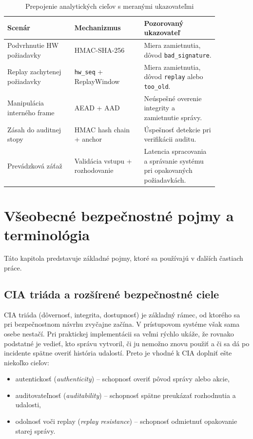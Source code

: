 \documentclass[journal,a4paper,onecolumn]{IEEEtran}
\begin{document}
\begin{table}[!ht]
\centering
\caption{Prepojenie analytických cieľov s meranými ukazovateľmi}
\label{tab:analytics_goals}
\small
\begin{tabular}{p{0.27\linewidth} p{0.29\linewidth} p{0.30\linewidth}}
\toprule
\textbf{Scenár} & \textbf{Mechanizmus} & \textbf{Pozorovaný ukazovateľ} \\
\midrule
Podvrhnutie HW požiadavky & HMAC-SHA-256 & Miera zamietnutia, dôvod \texttt{bad\_signature}. \\
Replay zachytenej požiadavky & \texttt{hw\_seq} + ReplayWindow & Miera zamietnutia, dôvod \texttt{replay} alebo \texttt{too\_old}. \\
Manipulácia interného frame & AEAD + AAD & Neúspešné overenie integrity a zamietnutie správy. \\
Zásah do auditnej stopy & HMAC hash chain + anchor & Úspešnosť detekcie pri verifikácii auditu. \\
Prevádzková záťaž & Validácia vstupu + rozhodovanie & Latencia spracovania a správanie systému pri opakovaných požiadavkách. \\
\bottomrule
\end{tabular}
\normalsize
\end{table}

\section{Všeobecné bezpečnostné pojmy a terminológia}

Táto kapitola predstavuje základné pojmy, ktoré sa používajú v ďalších častiach práce.

\subsection{CIA triáda a rozšírené bezpečnostné ciele}

CIA triáda (dôvernosť, integrita, dostupnosť) je základný rámec, od ktorého sa pri bezpečnostnom návrhu zvyčajne začína. V prístupovom systéme však sama osebe nestačí. Pri praktickej implementácii sa veľmi rýchlo ukáže, že rovnako podstatné je vedieť, kto správu vytvoril, či ju nemožno znovu použiť a či sa dá po incidente spätne overiť história udalostí. Preto je vhodné k CIA doplniť ešte niekoľko cieľov:

\begin{itemize}[leftmargin=*,itemsep=2pt]
  \item autentickosť (\emph{authenticity}) -- schopnosť overiť pôvod správy alebo akcie,
  \item auditovateľnosť (\emph{auditability}) -- schopnosť spätne preukázať rozhodnutia a udalosti,
  \item odolnosť voči replay (\emph{replay resistance}) -- schopnosť odmietnuť opakovanie starej správy.
\end{itemize}
\end{document}
